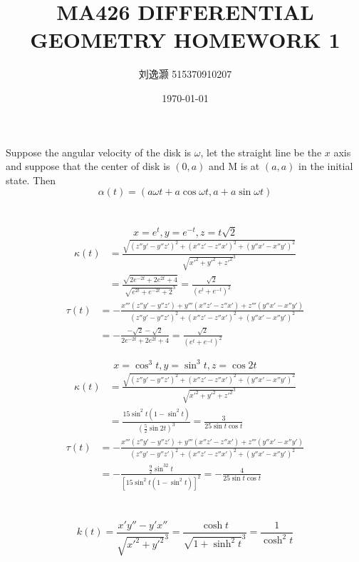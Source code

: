 \documentclass{article}
\title{MA426 DIFFERENTIAL GEOMETRY HOMEWORK 1}
\author{刘逸灏 515370910207}
\date{\today}
\begin{document}
\maketitle

\section{}
Suppose the angular velocity of the disk is $\omega$, let the straight line be the $x$ axis and suppose that the center of disk is $(0,a)$ and M is at $(a,a)$ in the initial state. Then
$$\alpha(t)=(a\omega t+a\cos\omega t,a+a\sin\omega t)$$

\section{}
$$x=e^t,y=e^{-t},z=t\sqrt{2}$$
\begin{align*}
\kappa(t)&=\frac{\sqrt{(z''y'-y''z')^2+(x''z'-z''x')^2+(y''x'-x''y')^2}}{\sqrt{x'^2+y'^2+z'^2}^3}\\
&=\frac{\sqrt{2e^{-2t}+2e^{2t}+4}}{\sqrt{e^{2t}+e^{-2t}+2}^3}
=\frac{\sqrt{2}}{(e^t+e^{-t})^2}
\end{align*}
\begin{align*}
\tau(t)&=-\frac{x'''(z''y'-y''z')+y'''(x''z'-z''x')+z'''(y''x'-x''y')}{(z''y'-y''z')^2+(x''z'-z''x')^2+(y''x'-x''y')^2}\\
&=-\frac{-\sqrt{2}-\sqrt{2}}{2e^{-2t}+2e^{2t}+4}
=\frac{\sqrt{2}}{(e^t+e^{-t})^2}
\end{align*}

$$x=\cos^3t,y=\sin^3t,z=\cos2t$$
\begin{align*}
\kappa(t)&=\frac{\sqrt{(z''y'-y''z')^2+(x''z'-z''x')^2+(y''x'-x''y')^2}}{\sqrt{x'^2+y'^2+z'^2}^3}\\
&=\frac{15\sin^2t(1-\sin^2t)}{(\frac{5}{2}\sin2t)^3}=\frac{3}{25\sin t\cos t}
\end{align*}
\begin{align*}
\tau(t)&=-\frac{x'''(z''y'-y''z')+y'''(x''z'-z''x')+z'''(y''x'-x''y')}{(z''y'-y''z')^2+(x''z'-z''x')^2+(y''x'-x''y')^2}\\
&=-\frac{\frac{9}{2}\sin^32t}{[15\sin^2t(1-\sin^2t)]^2}=-\frac{4}{25\sin t\cos t}
\end{align*}

\section{}
$$k(t)=\frac{x'y''-y'x''}{\sqrt{x'^2+y'^2}^3}=\frac{\cosh t}{\sqrt{1+\sinh^2t}^3}=\frac{1}{\cosh^2t}$$
\end{document}
